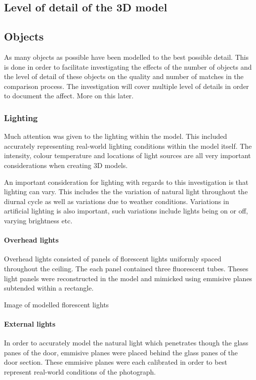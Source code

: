 \documentclass[11pt,a4paper]{report}
\begin{document}
		\subsection{Level of detail of the 3D model}
			\subsection{Objects}
				As many objects as possible have been modelled to the best possible detail. This is done in order to facilitate investigating the effects of the number of objects and the level of detail of these objects on the quality and number of matches in the comparison process. The investigation will cover multiple level of details in order to document the affect. More on this later.
			\subsubsection{Lighting}
				Much attention was given to the lighting within the model. This included accurately representing real-world lighting conditions within the model itself. The intensity, colour temperature and locations of light sources are all very important considerations when creating 3D models.
				
				An important consideration for lighting with regards to this investigation is that lighting can vary. This includes the the variation of natural light throughout the diurnal cycle as well as variations due to weather conditions. Variations in artificial lighting is also important, such variations include lights being on or off, varying brightness etc.
				\paragraph{Overhead lights}
					Overhead lights consisted of panels of florescent lights uniformly spaced throughout the ceiling. The each panel contained three fluorescent tubes. Theses light panels were reconstructed in the model and mimicked using emmisive planes subtended within a rectangle.
					
					{{Image of modelled florescent lights}}
				
				\paragraph{External lights}
					In order to accurately model the natural light which penetrates though the glass panes of the door, emmisive planes were placed behind the glass panes of the door section. These emmisive planes were each calibrated in order to best represent real-world conditions of the photograph.
					
\end{document}
